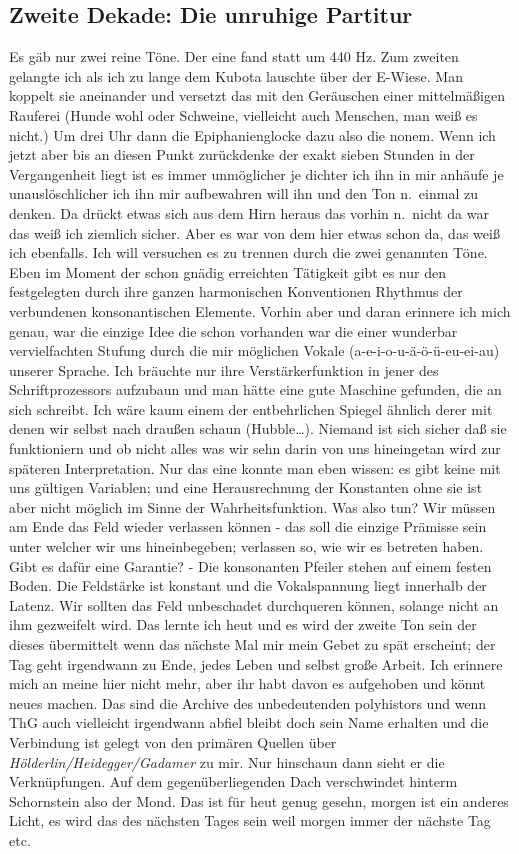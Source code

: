\documentclass[
]{article}
\author{}
\date{\vspace{-2.5em}}
\begin{document}
\subsection{Zweite Dekade: Die unruhige
Partitur}\label{zweite-dekade-die-unruhige-partitur}

Es gäb nur zwei reine Töne. Der eine fand statt um 440 Hz. Zum zweiten
gelangte ich als ich zu lange dem Kubota lauschte über der E-Wiese. Man
koppelt sie aneinander und versetzt das mit den Geräuschen einer
mittelmäßigen Rauferei (Hunde wohl oder Schweine, vielleicht auch
Menschen, man weiß es nicht.) Um drei Uhr dann die Epiphanienglocke dazu
also die nonem. Wenn ich jetzt aber bis an diesen Punkt zurückdenke der
exakt sieben Stunden in der Vergangenheit liegt ist es immer unmöglicher
je dichter ich ihn in mir anhäufe je unauslöschlicher ich ihn mir
aufbewahren will ihn und den Ton n.~einmal zu denken. Da drückt etwas
sich aus dem Hirn heraus das vorhin n.~nicht da war das weiß ich
ziemlich sicher. Aber es war von dem hier etwas schon da, das weiß ich
ebenfalls. Ich will versuchen es zu trennen durch die zwei genannten
Töne. Eben im Moment der schon gnädig erreichten Tätigkeit gibt es nur
den festgelegten durch ihre ganzen harmonischen Konventionen Rhythmus
der verbundenen konsonantischen Elemente. Vorhin aber und daran erinnere
ich mich genau, war die einzige Idee die schon vorhanden war die einer
wunderbar vervielfachten Stufung durch die mir möglichen Vokale
(a-e-i-o-u-ä-ö-ü-eu-ei-au) unserer Sprache. Ich bräuchte nur ihre
Verstärkerfunktion in jener des Schriftprozessors aufzubaun und man
hätte eine gute Maschine gefunden, die an sich schreibt. Ich wäre kaum
einem der entbehrlichen Spiegel ähnlich derer mit denen wir selbst nach
draußen schaun (Hubble\ldots). Niemand ist sich sicher daß sie
funktioniern und ob nicht alles was wir sehn darin von uns hineingetan
wird zur späteren Interpretation. Nur das eine konnte man eben wissen:
es gibt keine mit uns gültigen Variablen; und eine Herausrechnung der
Konstanten ohne sie ist aber nicht möglich im Sinne der
Wahrheitsfunktion. Was also tun? Wir müssen am Ende das Feld wieder
verlassen können - das soll die einzige Prämisse sein unter welcher wir
uns hineinbegeben; verlassen so, wie wir es betreten haben. Gibt es
dafür eine Garantie? - Die konsonanten Pfeiler stehen auf einem festen
Boden. Die Feldstärke ist konstant und die Vokalspannung liegt innerhalb
der Latenz. Wir sollten das Feld unbeschadet durchqueren können, solange
nicht an ihm gezweifelt wird. Das lernte ich heut und es wird der zweite
Ton sein der dieses übermittelt wenn das nächste Mal mir mein Gebet zu
spät erscheint; der Tag geht irgendwann zu Ende, jedes Leben und selbst
große Arbeit. Ich erinnere mich an meine hier nicht mehr, aber ihr habt
davon es aufgehoben und könnt neues machen. Das sind die Archive des
unbedeutenden polyhistors und wenn ThG auch vielleicht irgendwann abfiel
bleibt doch sein Name erhalten und die Verbindung ist gelegt von den
primären Quellen über \emph{Hölderlin/Heidegger/Gadamer} zu mir. Nur
hinschaun dann sieht er die Verknüpfungen. Auf dem gegenüberliegenden
Dach verschwindet hinterm Schornstein also der Mond. Das ist für heut
genug gesehn, morgen ist ein anderes Licht, es wird das des nächsten
Tages sein weil morgen immer der nächste Tag etc.
\end{document}

